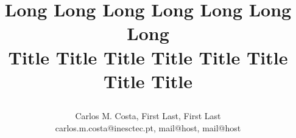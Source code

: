 





\title{\parbox{\linewidth}{\centering Long Long Long Long Long Long Long\\Title Title Title Title Title Title Title Title}}
\author{Carlos M. Costa, First Last, First Last\texorpdfstring{\\{\LARGE \ttfamily carlos.m.costa@inesctec.pt, mail@host, mail@host}}{}}




\maketitle



\begin{columns}
	
	
	
	
	
\end{columns}


\endinput
